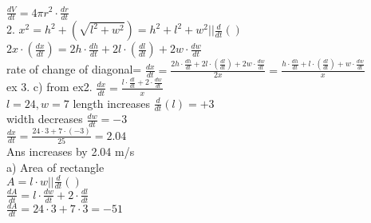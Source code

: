 \documentclass{article}
\begin{document}
  $\frac{dV}{dt}=4\pi r^2\cdot\frac{dr}{dt}$\\
  2. $x^2=h^2+(\sqrt{l^2+w^2})=h^2+l^2+w^2 || \frac{d}{dt}()$\\
  $2x\cdot(\frac{dx}{dt})=2h\cdot\frac{dh}{dt}+2l\cdot(\frac{dl}{dt})+2w\cdot\frac{dw}{dt}$\\
  rate of change of diagonal= $\frac{dx}{dt}=\frac{2h\cdot\frac{dh}{dt}+2l\cdot(\frac{dl}{dt})+2w\cdot\frac{dw}{dt}}{2x}=\frac{h\cdot\frac{dh}{dt}+l\cdot(\frac{dl}{dt})+w\cdot\frac{dw}{dt}}{x}$\\
  ex 3. c) from ex2. $\frac{dx}{dt}=\frac{l\cdot\frac{dl}{dt}+2\cdot\frac{dw}{dt}}{x}$\\
  $l=24,w=7$ length increases $\frac{d}{dt}(l)=+3$\\
  width decreases $\frac{dw}{dt}=-3$\\
  $\frac{dx}{dt}=\frac{24\cdot3+7\cdot(-3)}{25}=2.04$\\
  Ans increases by 2.04 m/s\\
  a) Area of rectangle\\
  $A=l\cdot w || \frac{d}{dt}()$\\
  $\frac{dA}{dt}=l\cdot\frac{dw}{dt}+2\cdot\frac{dl}{dt}$\\
  $\frac{dA}{dt}=24\cdot3+7\cdot3=-51$\\
  

   
\end{document}
